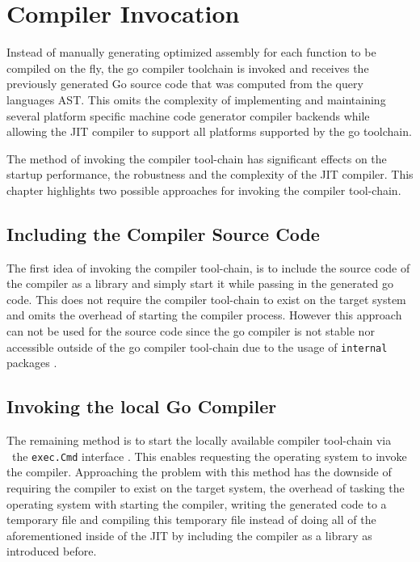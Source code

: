 \chapter{Compiler Invocation}

Instead of manually generating optimized assembly for each function to be
compiled on the fly, the go compiler toolchain is invoked and receives the
previously  generated Go source code that was computed from the query languages
AST. This omits the complexity of implementing and maintaining several platform
specific machine code generator compiler backends while allowing the JIT
compiler to support all platforms supported by the go toolchain.

The method of invoking the compiler tool-chain has significant effects on the
startup performance, the robustness and the complexity of the JIT compiler.
This chapter highlights two possible approaches for invoking the compiler
tool-chain. 

\section{Including the Compiler Source Code}

The first idea of invoking the compiler tool-chain, is to include the source
code of the compiler as a library and simply start it while passing in the
generated go code. This does not require the compiler tool-chain to exist on
the target system and omits the overhead of starting the compiler process.
However this approach can not be used for the source code since the go compiler
is not stable nor accessible outside of the go compiler tool-chain
\cite[\textit{(gcToolchain).gc}]{gc_source} due to the usage of
\texttt{internal} packages \cite{go_internal_dir}.

\section{Invoking the local Go Compiler}

The remaining method is to start the locally available compiler tool-chain via
\ the \texttt{exec.Cmd} interface \cite[Overview]{go_os_exec}. This enables
requesting the operating system to invoke the compiler. Approaching the problem
with this method has the downside of requiring the compiler to exist on the
target system, the overhead of tasking the operating system with starting the
compiler, writing the generated code to a temporary file and compiling this
temporary file instead of doing all of the aforementioned inside of the JIT by
including the compiler as a library as introduced before.

